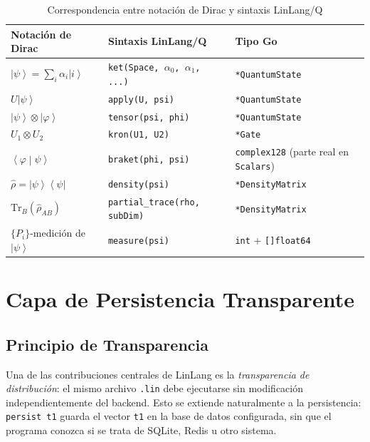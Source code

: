 \documentclass[12pt, a4paper, openany]{report}
\theoremstyle{definition}
\newcommand{\ket}[1]{\left|#1\right\rangle}
\newcommand{\bra}[1]{\left\langle#1\right|}
\newcommand{\braketnotation}[2]{\left\langle#1\middle|#2\right\rangle}
\newcommand{\density}{\hat{\rho}}
\newcommand{\tr}{\mathrm{Tr}}
\begin{document}
\begin{table}[H]
\centering
\caption{Correspondencia entre notación de Dirac y sintaxis LinLang/Q}
\label{tab:dirac-linlang}
\begin{tabularx}{\linewidth}{@{}L{4.2cm}L{4.5cm}L{4.5cm}@{}}
\toprule
\textbf{Notación de Dirac} & \textbf{Sintaxis LinLang/Q} & \textbf{Tipo Go} \\
\midrule
$\ket{\psi} = \sum_i \alpha_i \ket{i}$ & \texttt{ket(Space, $\alpha_0$, $\alpha_1$, ...)} & \texttt{*QuantumState} \\
$U\ket{\psi}$ & \texttt{apply(U, psi)} & \texttt{*QuantumState} \\
$\ket{\psi}\otimes\ket{\varphi}$ & \texttt{tensor(psi, phi)} & \texttt{*QuantumState} \\
$U_1\otimes U_2$ & \texttt{kron(U1, U2)} & \texttt{*Gate} \\
$\braketnotation{\varphi}{\psi}$ & \texttt{braket(phi, psi)} & \texttt{complex128} (parte real en \texttt{Scalars}) \\
$\density = \ket{\psi}\bra{\psi}$ & \texttt{density(psi)} & \texttt{*DensityMatrix} \\
$\tr_B(\density_{AB})$ & \texttt{partial\_trace(rho, subDim)} & \texttt{*DensityMatrix} \\
$\{P_i\}$-medición de $\ket{\psi}$ & \texttt{measure(psi)} & \texttt{int} + \texttt{[]float64} \\
\bottomrule
\end{tabularx}
\end{table}

\chapter{Capa de Persistencia Transparente}
\label{ch:persistencia}

\section{Principio de Transparencia}

Una de las contribuciones centrales de LinLang es la \emph{transparencia de distribución}: el mismo archivo \texttt{.lin} debe ejecutarse sin modificación independientemente del backend. Esto se extiende naturalmente a la persistencia: \texttt{persist~t1} guarda el vector \texttt{t1} en la base de datos configurada, sin que el programa conozca si se trata de SQLite, Redis u otro sistema.
\end{document}
